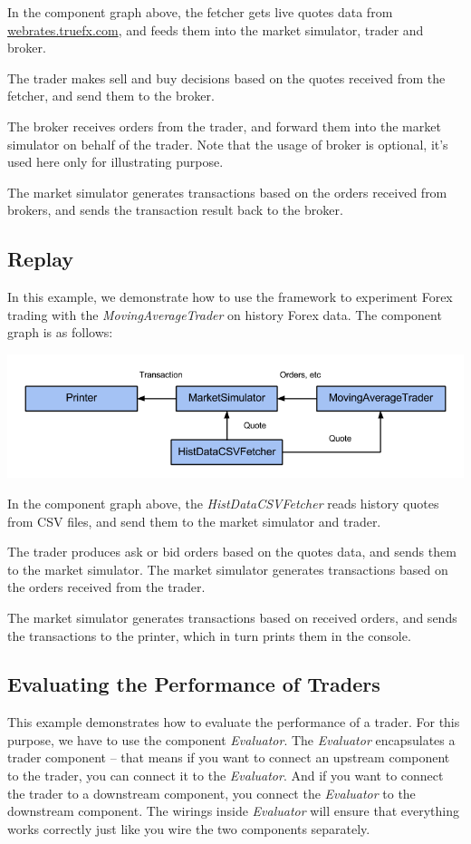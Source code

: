 In the component graph above, the fetcher gets live quotes data from \url{webrates.truefx.com}, and feeds them into the market simulator, trader and broker.

The trader makes sell and buy decisions based on the quotes received from the fetcher, and send them to the broker.

The broker receives orders from the trader, and forward them into the market simulator on behalf of the trader. Note that the usage of broker is optional, it's used here only for illustrating purpose.

The market simulator generates transactions based on the orders received from brokers, and sends the transaction result back to the broker.

\subsection{Replay}

In this example, we demonstrate how to use the framework to experiment Forex trading with the \emph{MovingAverageTrader} on history Forex data. The component graph is as follows:

\noindent
\includegraphics[width=\textwidth]{img/examples/forex-replay}

In the component graph above, the \emph{HistDataCSVFetcher} reads history quotes from CSV files, and send them to the market simulator and trader.

The trader produces ask or bid orders based on the quotes data, and sends them to the market simulator. The market simulator generates transactions based on the orders received from the trader.

The market simulator generates transactions based on received orders, and sends the transactions to the printer, which in turn prints them in the console.

\subsection{Evaluating the Performance of Traders}

This example demonstrates how to evaluate the performance of a trader. For this purpose, we have to use the component \emph{Evaluator}. The \emph{Evaluator} encapsulates a trader component -- that means if you want to connect an upstream component to the trader, you can connect it to the \emph{Evaluator}. And if you want to connect the trader to a downstream component, you connect the \emph{Evaluator} to the downstream component. The wirings inside \emph{Evaluator} will ensure that everything works correctly just like you wire the two components separately.

